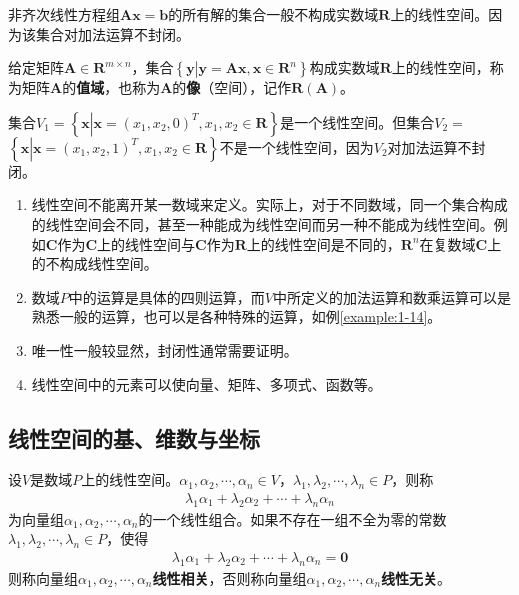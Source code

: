非齐次线性方程组$\mathbf{Ax=b}$的所有解的集合一般不构成实数域$\mathbf{R}$上的线性空间。因为该集合对加法运算不封闭。

\begin{example}
    给定矩阵$\mathbf{A}\in{\mathbf{R}^{m\times{n}}}$，集合$\left\{\mathbf{y}\left|\mathbf{y=Ax,x\in{R}}^{n}\right.\right\}$构成实数域$\mathbf{R}$上的线性空间，称为矩阵$\mathbf{A}$的\textbf{值域}，也称为$\mathbf{A}$的\textbf{像}（空间），记作$\mathbf{R(A)}$。
\end{example}

\begin{example}
    集合$V_{1}=\left\{\mathbf{x}\left|\mathbf{x}=\left(x_{1},x_{2},0\right)^{T},x_{1},x_{2}\in\mathbf{R}\right.\right\}$是一个线性空间。但集合$V_{2}=$\\
    $\left\{\mathbf{x}\left|\mathbf{x}=\left(x_{1},x_{2},1\right)^{T},x_{1},x_{2}\in\mathbf{R}\right.\right\}$不是一个线性空间，因为$V_{2}$对加法运算不封闭。
\end{example}

\begin{remark}
    \begin{enumerate}[label=(\arabic*)]
        \item 线性空间不能离开某一数域来定义。实际上，对于不同数域，同一个集合构成的线性空间会不同，甚至一种能成为线性空间而另一种不能成为线性空间。例如$\mathbf{C}$作为$\mathbf{C}$上的线性空间与$\mathbf{C}$作为$\mathbf{R}$上的线性空间是不同的，$\mathbf{R}^{n}$在复数域$\mathbf{C}$上的不构成线性空间。
        \item 数域$P$中的运算是具体的四则运算，而$V$中所定义的加法运算和数乘运算可以是熟悉一般的运算，也可以是各种特殊的运算，如例\autoref{example:1-14}。
        \item 唯一性一般较显然，封闭性通常需要证明。
        \item 线性空间中的元素可以使向量、矩阵、多项式、函数等。
    \end{enumerate}
\end{remark}

\subsection{线性空间的基、维数与坐标}
\begin{definition}
    设$V$是数域$P$上的线性空间。$\alpha_{1},\alpha_{2},\cdots,\alpha_{n}\in{V}$，$\lambda_{1},\lambda_{2},\cdots,\lambda_{n}\in{P}$，则称
    \begin{eqnarray}
        \lambda_{1}\alpha_{1}+\lambda_{2}\alpha_{2}+\cdots+\lambda_{n}\alpha_{n}\nonumber
    \end{eqnarray}
    为向量组$\alpha_{1},\alpha_{2},\cdots,\alpha_{n}$的一个线性组合。如果不存在一组不全为零的常数$\lambda_{1},\lambda_{2},\cdots,\lambda_{n}\in{P}$，使得
    \begin{eqnarray}
        \lambda_{1}\alpha_{1}+\lambda_{2}\alpha_{2}+\cdots+\lambda_{n}\alpha_{n}=\mathbf{0}\nonumber        
    \end{eqnarray}
    则称向量组$\alpha_{1},\alpha_{2},\cdots,\alpha_{n}$\textbf{线性相关}，否则称向量组$\alpha_{1},\alpha_{2},\cdots,\alpha_{n}$\textbf{线性无关}。
\end{definition}

